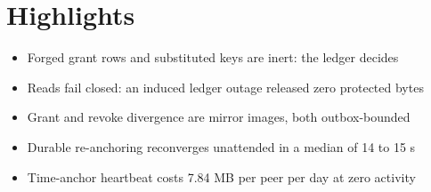 \documentclass{article}
\begin{document}
\section*{Highlights}
\begin{itemize}
\item Forged grant rows and substituted keys are inert: the ledger decides
\item Reads fail closed: an induced ledger outage released zero protected bytes
\item Grant and revoke divergence are mirror images, both outbox-bounded
\item Durable re-anchoring reconverges unattended in a median of 14 to 15 s
\item Time-anchor heartbeat costs 7.84 MB per peer per day at zero activity
\end{itemize}
\end{document}
